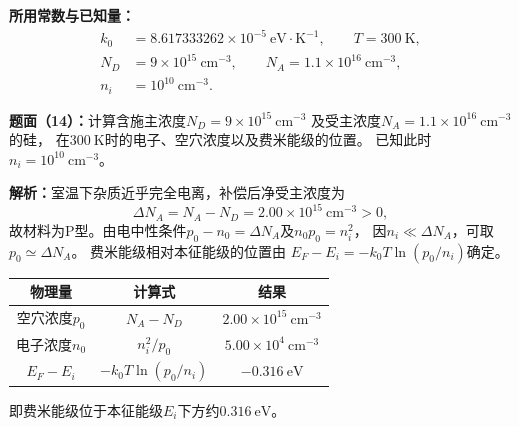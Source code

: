 \begin{problem}
    \textbf{所用常数与已知量：}
    \[
    \begin{aligned}
        k_0&=8.617333262\times10^{-5}\ \mathrm{eV\cdot K^{-1}},
        \qquad T=300\ \mathrm{K},\\
        N_D&=9\times10^{15}\ \mathrm{cm}^{-3},
        \qquad N_A=1.1\times10^{16}\ \mathrm{cm}^{-3},\\
        n_i&=10^{10}\ \mathrm{cm}^{-3}.
    \end{aligned}
    \]

    \textbf{题面（14）：}计算含施主浓度$N_D=9\times10^{15}\ \mathrm{cm}^{-3}$
    及受主浓度$N_A=1.1\times10^{16}\ \mathrm{cm}^{-3}$的硅，
    在$300\ \mathrm{K}$时的电子、空穴浓度以及费米能级的位置。
    已知此时$n_i=10^{10}\ \mathrm{cm}^{-3}$。

    \textbf{解析：}室温下杂质近乎完全电离，补偿后净受主浓度为
    \[
    \Delta N_A=N_A-N_D=2.00\times10^{15}\ \mathrm{cm}^{-3}>0,
    \]
    故材料为P型。由电中性条件$p_0-n_0=\Delta N_A$及$n_0p_0=n_i^2$，
    因$n_i\ll\Delta N_A$，可取$p_0\simeq\Delta N_A$。
    费米能级相对本征能级的位置由
    $E_F-E_i=-k_0T\ln(p_0/n_i)$确定。
    \begin{center}
        \begin{tabular}{c c c}
            \hline
            物理量 & 计算式 & 结果 \\
            \hline
            空穴浓度$p_0$ & $N_A-N_D$ & $\boxed{2.00\times10^{15}\ \mathrm{cm}^{-3}}$ \\
            电子浓度$n_0$ & $n_i^2/p_0$ & $\boxed{5.00\times10^4\ \mathrm{cm}^{-3}}$ \\
            $E_F-E_i$ & $-k_0T\ln(p_0/n_i)$ & $\boxed{-0.316\ \mathrm{eV}}$ \\
            \hline
        \end{tabular}
    \end{center}
    即费米能级位于本征能级$E_i$下方约$0.316\ \mathrm{eV}$。
\end{problem}

